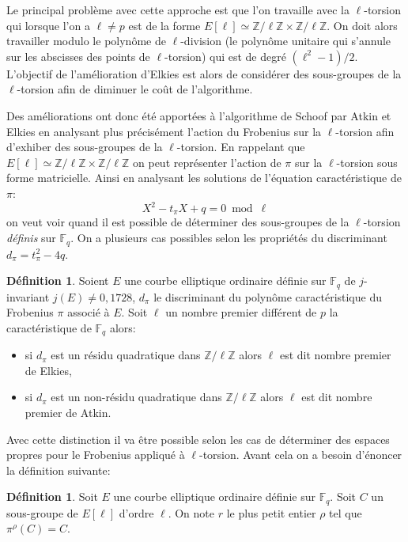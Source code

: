 \documentclass[10pt,a4paper]{book}
\theoremstyle{plain}
\theoremstyle{definition}
\theoremstyle{definition}
\theoremstyle{definition}
\theoremstyle{definition}
\newtheorem{defi}[thm]{Définition}
\theoremstyle{remark}
\theoremstyle{remark}
\begin{document}
Le principal problème avec cette approche est que l'on travaille avec la $\ell$-torsion qui lorsque l'on a $\ell \neq p$ est de la forme $E[\ell] \simeq \mathbb{Z}/\ell \mathbb{Z} \times \mathbb{Z}/\ell \mathbb{Z}$. On doit alors travailler modulo le polynôme de $\ell$-division (le polynôme unitaire qui s'annule sur les abscisses des points de $\ell$-torsion) qui est de degré $(\ell^2-1)/2$. L'objectif de l'amélioration d'Elkies est alors de considérer des sous-groupes de la $\ell$-torsion afin de diminuer le coût de l'algorithme.

Des améliorations ont donc été apportées à l'algorithme de Schoof par Atkin et Elkies en analysant plus précisément l'action du Frobenius sur la $\ell$-torsion afin d'exhiber des sous-groupes de la $\ell$-torsion. En  rappelant que $E[\ell] \simeq \mathbb{Z}/\ell \mathbb{Z} \times \mathbb{Z}/\ell \mathbb{Z}$ on peut représenter l'action de $\pi$ sur la $\ell$-torsion sous forme matricielle. Ainsi en analysant les solutions de l'équation caractéristique de $\pi$:
\begin{equation*}
X^2-t_{\pi}X+q = 0 \bmod \ell
\end{equation*} 
on veut voir quand il est possible de déterminer des sous-groupes de la $\ell$-torsion \emph{définis} sur $\mathbb{F}_q$.
On a plusieurs cas possibles selon les propriétés du discriminant $d_{\pi}=t_{\pi}^2-4q$.

\begin{defi}\label{def:dif-Atk-Elk}
Soient $E$ une courbe elliptique ordinaire définie sur $\mathbb{F}_q$ de $j$-invariant $j(E) \neq 0,1728$, $d_{\pi}$ le discriminant du polynôme caractéristique du Frobenius $\pi$ associé à $E$. Soit $\ell$ un nombre premier différent de $p$ la caractéristique de $\mathbb{F}_q$ alors:
\begin{itemize}
\item si $d_{\pi}$ est un résidu quadratique dans $\mathbb{Z}/\ell \mathbb{Z}$ alors $\ell$ est dit nombre premier de Elkies,
\item si $d_{\pi}$ est un non-résidu quadratique dans $\mathbb{Z}/\ell \mathbb{Z}$ alors $\ell$ est dit nombre premier de Atkin.
\end{itemize} 
\end{defi}
	Avec cette distinction il va être possible selon les cas de déterminer des espaces propres pour le Frobenius appliqué à $\ell$-torsion. Avant cela on a besoin d'énoncer la définition suivante:
\begin{defi}
Soit $E$ une courbe elliptique ordinaire définie sur $\mathbb{F}_q$. Soit $C$ un sous-groupe de $E[\ell]$ d'ordre $\ell$. On note $r$ le plus petit entier $\rho$ tel que $\pi^{\rho}(C)=C$.
\end{defi}	
	 
\end{document}
